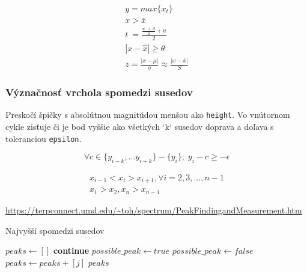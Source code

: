 \begin{ceqn}\begin{align}
y = max\{x_t\} \\
x > \bar{x} \\
t\ =\frac{\frac{u\ \ +\ d}{2}+u}{2} \\
|x - \hat{x}| \geq \theta \\
z = \frac{|x - \mu|}{\sigma} \approx \frac{|x - \bar{x}|}{S}
\end{align}\end{ceqn}

\subsubsection{Význačnosť vrchola spomedzi susedov}
Preskočí špičky s absolútnou magnitúdou menšou ako \verb|height|. Vo vnútornom cykle zisťuje či je bod vyššie ako všetkých `k` susedov doprava a doľava s toleranciou \verb|epsilon|.

\begin{equation}
\forall c \in \{y_{i-k}, ... y_{i+k}\} - \{y_i\}; \; y_i - c \geq -\epsilon
\end{equation}
\cite{survey-peaks-valleys} 
\begin{ceqn}\begin{align}
x_{i-1} < x_i > x_{i+1}, \forall i = 2, 3, ..., n - 1 \\
x_1 > x_2, x_n > x_{n-1}
\end{align}\end{ceqn}
\url{https://terpconnect.umd.edu/~toh/spectrum/PeakFindingandMeasurement.htm}

\begin{algorithm}
\caption{Najvyšší spomedzi susedov}
\begin{algorithmic}[1]
	\State $peaks \gets []$ 	
		  
			\State \textbf{continue}
		\EndIf
		\State $possible\_peak \gets true$
				\State $possible\_peak \gets false$     
			\EndIf
		\EndFor
			\State $peaks \gets peaks + [j]$
		\EndIf
	\EndFor
	\State \Return $peaks$
\EndFunction
\end{algorithmic}
\end{algorithm}

